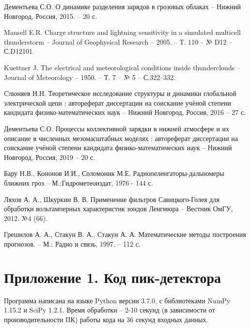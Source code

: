 \documentclass[a4paper,14pt]{extarticle}
\begin{document}
\newpage
{}
\begin{thebibliography}{99}
 Дементьева С.О. О динамике разделения зарядов в грозовых облаках -- Нижний Новгород, Россия, 2015. -- 20 с.

 Mansell E.R. Charge structure and lightning sensitivity in a simulated multicell thunderstorm  -- Journal of Geophysical Research -- 2005. -- Т. 110 -- № D12 -- С.D12101.


 Kuettner J. The electrical and meteorological conditions inside thunderclouds -- Journal of Meteorology -- 1950. -- Т. 7 -- № 5 -- С.322–332.

 Cлюняев Н.Н.  Теоретическое исследование структуры и динамики глобальной электрической цепи : автореферат диссертации на соискание учёной степени кандидата физико-математических наук -- Нижний Новгород, Россия, 2016 -- 27 с.

 Дементьева С.О. Процессы коллективной зарядки в нижней атмосфере и их описание в численных мезомасштабных моделях : автореферат диссертации на соискание учёной степени кандидата физико-математических наук -- Нижний Новгород, Россия, 2019 -- 20 с.



 Бару Н.В., Кононов И.И., Соломоник М.Е. Радиопеленгаторы-дальномеры ближних гроз -- М.:Гидрометеоиздат, 1976 - 144 с.

 Ляхов А. А., Шкуркин В. В. Применение фильтров Савицкого-Голея для обработки вольтамперных характеристик зондов Ленгмюра -- Вестник ОмГУ, 2012. №4 (66). 


 Грешилов А. А., Стакун В. А., Стакун А. А. Математические методы построения прогнозов. -- М.: Радио и связь, 1997. -- 112 с.
\end{thebibliography}

\newpage
\section*{Приложение 1. Код пик-детектора}

Программа написана на языке Python версии 3.7.0, с библиотеками NumPy 1.15.2 и SciPy 1.2.1. Время обработки  -- 2-10 секунд (в зависимости от производительности ПК) работы кода на 36 секунд входных данных. 
\vspace{1em}
\begin{spacing}{0.9}
\end{spacing}
\end{document}
